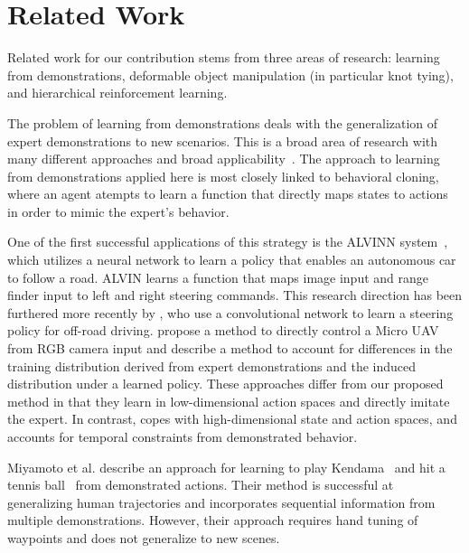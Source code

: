 \section{Related Work}
Related work for our contribution stems from three areas of research:
learning from demonstrations, deformable object manipulation (in particular
knot tying), and hierarchical reinforcement learning.


The problem of learning from demonstrations deals with the generalization of expert demonstrations to new scenarios. 
This is a broad area of research with many different approaches and broad applicability~\cite{Argall_2009, Schaal_1999}.
The approach to learning from demonstrations applied here is most closely linked to behavioral cloning, where an agent atempts to learn a function that directly maps states to actions in order to mimic the expert's behavior. 

One of the first successful applications of this strategy is the ALVINN system~\cite{Pomerleau_NIPS1989}, which utilizes a neural network to learn a policy that enables an autonomous car to follow a road.
ALVIN learns a function that maps image input and range finder input to left and right steering commands. 
This research direction has been furthered more recently by \citet{muller2005off}, who use a convolutional network to learn a steering policy for off-road driving.
\citet{Ross_2013} propose a method to directly control a Micro UAV from RGB camera input and describe a method to account for differences in the training distribution derived from expert demonstrations and the induced distribution under a learned policy. 
These approaches differ from our proposed method in that they learn in low-dimensional action spaces and directly imitate the expert.
In contrast, \mmql{} copes with high-dimensional state and action spaces, and accounts for temporal constraints from demonstrated behavior.

Miyamoto et al. describe an approach for learning to play Kendama~\cite{Miyamoto_1996} and hit a tennis ball~\cite{Miyamoto_1998} from demonstrated actions. 
Their method is successful at generalizing human trajectories and incorporates sequential information from multiple demonstrations.
However, their approach requires hand tuning of waypoints and does not generalize to new scenes.

